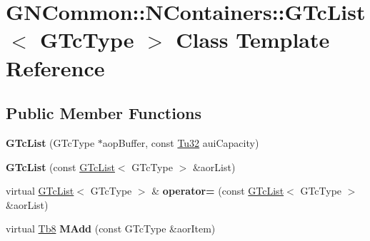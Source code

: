 \hypertarget{class_g_n_common_1_1_n_containers_1_1_g_tc_list}{}\section{G\+N\+Common\+:\+:N\+Containers\+:\+:G\+Tc\+List$<$ G\+Tc\+Type $>$ Class Template Reference}
\label{class_g_n_common_1_1_n_containers_1_1_g_tc_list}
\subsection*{Public Member Functions}
\begin{DoxyCompactItemize}
\item 
\mbox{\label{class_g_n_common_1_1_n_containers_1_1_g_tc_list_a3c9ac165409f6154366676e4895722e0}} 
{\bfseries G\+Tc\+List} (G\+Tc\+Type $\ast$aop\+Buffer, const \mbox{\hyperlink{namespace_g_n_common_a941b527ef318f318aed7903dc832b7e4}{Tu32}} aui\+Capacity)
\item 
\mbox{\label{class_g_n_common_1_1_n_containers_1_1_g_tc_list_a03513b89abcd069d6bf75a110edccccc}} 
{\bfseries G\+Tc\+List} (const \mbox{\hyperlink{class_g_n_common_1_1_n_containers_1_1_g_tc_list}{G\+Tc\+List}}$<$ G\+Tc\+Type $>$ \&aor\+List)
\item 
\mbox{\label{class_g_n_common_1_1_n_containers_1_1_g_tc_list_a1af49ef8b3adc4a2537c316234e7cda0}} 
virtual \mbox{\hyperlink{class_g_n_common_1_1_n_containers_1_1_g_tc_list}{G\+Tc\+List}}$<$ G\+Tc\+Type $>$ \& {\bfseries operator=} (const \mbox{\hyperlink{class_g_n_common_1_1_n_containers_1_1_g_tc_list}{G\+Tc\+List}}$<$ G\+Tc\+Type $>$ \&aor\+List)
\item 
\mbox{\label{class_g_n_common_1_1_n_containers_1_1_g_tc_list_af0cba95288517ccfc2af1e34a0c17f2c}} 
virtual \mbox{\hyperlink{namespace_g_n_common_a8115dc7ed53b6e5b52e6bfde1632ea74}{Tb8}} {\bfseries M\+Add} (const G\+Tc\+Type \&aor\+Item)
\item 
\mbox{\label{class_g_n_common_1_1_n_containers_1_1_g_tc_list_ae630196feee0851049e7639ea41893d0}} 

\end{DoxyCompactItemize}
